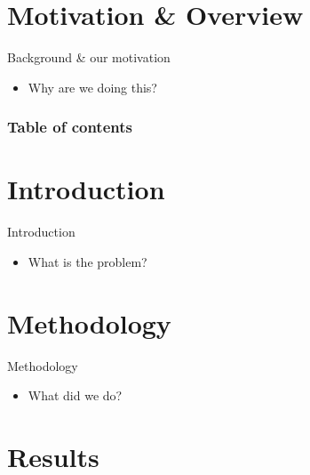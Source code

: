 \documentclass[compress]{beamer}
\title{\presentationtitle}
\subtitle{\presentationsubtitle}
\date{\presentationdate}
\author{\presentingauthor}
\institute{\labname}
\begin{document}
\maketitle

\section*{Motivation \& Overview}

\begin{frame}{Background \& our motivation}
	\begin{itemize}
		\item Why are we doing this? \cite{example}
	\end{itemize}
\end{frame}

\begin{frame}
	\frametitle{Table of contents}
	\tableofcontents
\end{frame}

\section{Introduction}

\begin{frame}{Introduction}
	\begin{itemize}
		\item What is the problem?
	\end{itemize}
\end{frame}

\section{Methodology}

\begin{frame}{Methodology}
	\begin{itemize}
		\item What did we do?
	\end{itemize}
\end{frame}

\section{Results}
\end{document}
